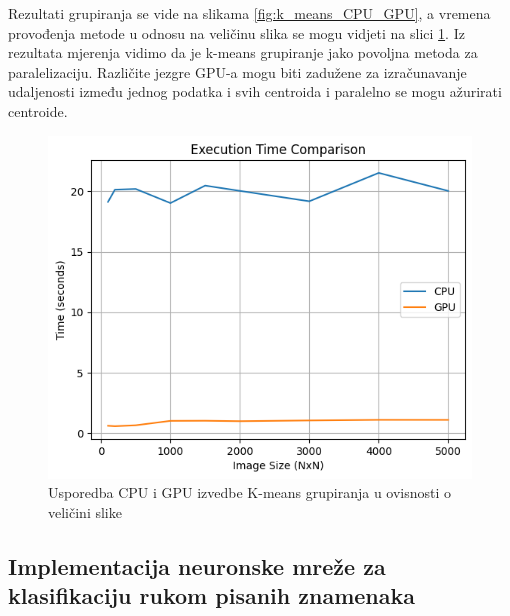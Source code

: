 \documentclass[a4paper,twocolumn]{article}
\begin{document}
        Rezultati grupiranja se vide na slikama \ref{fig:k_means_CPU_GPU}, a vremena provođenja metode u odnosu na veličinu slika se mogu vidjeti na slici \ref{fig:k_means_timing}. Iz rezultata mjerenja vidimo da je k-means grupiranje jako povoljna metoda za paralelizaciju. Različite jezgre GPU-a mogu biti zadužene za izračunavanje udaljenosti između jednog podatka i svih centroida i paralelno se mogu ažurirati centroide.
        
        \begin{figure}[H]
        	\centering
        	\includegraphics[width=1\linewidth]{slike/k_means_timing.png} 
        	\caption{Usporedba CPU i GPU izvedbe K-means grupiranja u ovisnosti o veličini slike}
        	\label{fig:k_means_timing}
        \end{figure}
	
	\subsection{Implementacija neuronske mreže za klasifikaciju rukom pisanih znamenaka}
\end{document}
